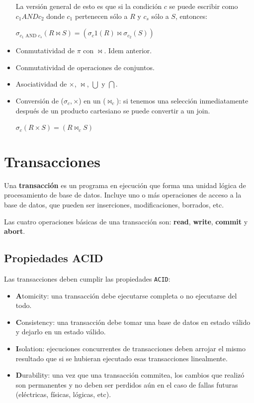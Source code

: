 \documentclass[]{article}
\begin{document}
\begin{itemize}
    La versión general de esto es que si la condición $c$ se puede escribir como $c_1 AND c_2$ donde $c_1$ pertenecen sólo a $R$ y $c_s$ sólo a $S$, entonces:
    \begin{center}
        $\sigma_{c_1\text{ AND }c_s}(R\bowtie S) = (\sigma_c1(R)\bowtie \sigma_{c_2}(S))$
    \end{center}
    \item Conmutatividad de $\pi$ con $\bowtie$. Idem anterior.
    \item Conmutatividad de operaciones de conjuntos.
    \item Asociatividad de $\times$, $\bowtie$, $\bigcup$ y $\bigcap$.
    \item Conversión de ($\sigma_c, \times$) en un ($\bowtie_c$): si tenemos una selección inmediatamente después de un producto cartesiano se puede convertir a un join.
    \begin{center}
        $\sigma_c(R\times S) = (R \bowtie_c S)$
    \end{center}
\end{itemize}


\section{Transacciones}
Una \textbf{transacción} es un programa en ejecución que forma una unidad lógica de procesamiento de base de datos. Incluye uno o más operaciones de acceso a la base de datos, que pueden ser inserciones, modificaciones, borrados, etc.

Las cuatro operaciones básicas de una transacción son: \textbf{read}, \textbf{write}, \textbf{commit} y \textbf{abort}.

\subsection{Propiedades ACID}
Las transacciones deben cumplir las propiedades \texttt{ACID}:
\begin{itemize}
    \item \textbf{A}tomicity: una transacción debe ejecutarse completa o no ejecutarse del todo.
    \item \textbf{C}onsistency: una transacción debe tomar una base de datos en estado válido y dejarlo en un estado válido.
    \item \textbf{I}solation: ejecuciones concurrentes de transacciones deben arrojar el mismo resultado que si se hubieran ejecutado esas transacciones linealmente.
    \item \textbf{D}urability: una vez que una transacción commitea, los cambios que realizó son permanentes y no deben ser perdidos aún en el caso de fallas futuras (eléctricas, físicas, lógicas, etc).
\end{itemize}
\end{document}
